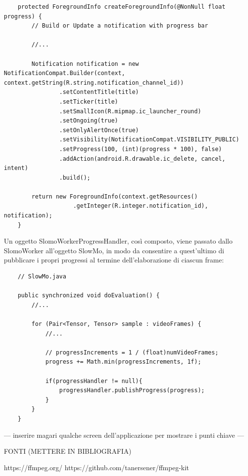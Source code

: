 \begin{lstlisting}
    protected ForegroundInfo createForegroundInfo(@NonNull float progress) {
        // Build or Update a notification with progress bar

        //...

        Notification notification = new NotificationCompat.Builder(context, context.getString(R.string.notification_channel_id))
                .setContentTitle(title)
                .setTicker(title)
                .setSmallIcon(R.mipmap.ic_launcher_round)
                .setOngoing(true)
                .setOnlyAlertOnce(true)
                .setVisibility(NotificationCompat.VISIBILITY_PUBLIC)
                .setProgress(100, (int)(progress * 100), false)
                .addAction(android.R.drawable.ic_delete, cancel, intent)
                .build();

        return new ForegroundInfo(context.getResources()
                    .getInteger(R.integer.notification_id), notification);
    }
\end{lstlisting}

Un oggetto SlomoWorkerProgressHandler, così composto, viene passato dallo SlomoWorker all'oggetto SlowMo, in modo da
consentire a quest'ultimo di pubblicare i propri progressi al termine dell'elaborazione di ciascun frame:

\begin{lstlisting}
    // SlowMo.java

    public synchronized void doEvaluation() {
        //...

        for (Pair<Tensor, Tensor> sample : videoFrames) {
            //...

            // progressIncrements = 1 / (float)numVideoFrames;
            progress += Math.min(progressIncrements, 1f);

            if(progressHandler != null){
                progressHandler.publishProgress(progress);
            }
        }
    }
\end{lstlisting}


--- inserire magari qualche screen dell'applicazione per mostrare i punti chiave ---

FONTI (METTERE IN BIBLIOGRAFIA)

https://ffmpeg.org/
https://github.com/tanersener/ffmpeg-kit